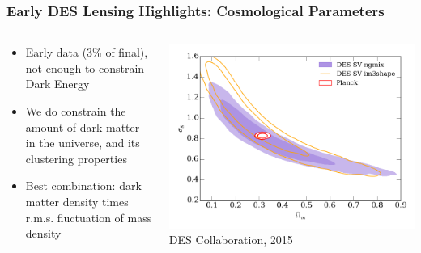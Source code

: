 \documentclass{beamer}
\begin{document}
\frame
{

    \frametitle{Early DES Lensing Highlights: Cosmological Parameters}

 
    \begin{columns}
        \begin{column}{0.4\textwidth}
            \begin{itemize}

                \item Early data (3\% of final), not enough to constrain Dark Energy
                
                \item We do constrain the amount of dark matter in the universe, and
                    its clustering properties

                \item Best combination: dark matter density times r.m.s. fluctuation
                    of mass density

            \end{itemize}
        \end{column}
        \begin{column}{0.6\textwidth}
                \centering
                \includegraphics[width=\textwidth]{Om_sig8_im3.png}
                \newline
                {\tiny DES Collaboration, 2015}
        \end{column}
    \end{columns}

}
\end{document}
